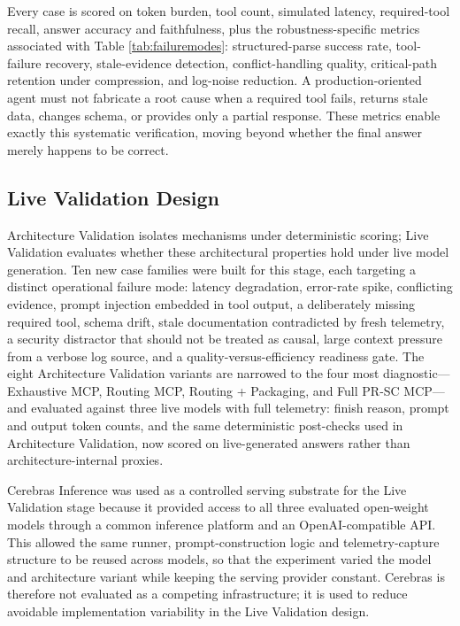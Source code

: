 Every case is scored on token burden, tool count, simulated latency, required-tool recall, answer accuracy and faithfulness, plus the robustness-specific metrics associated with Table \ref{tab:failuremodes}: structured-parse success rate, tool-failure recovery, stale-evidence detection, conflict-handling quality, critical-path retention under compression, and log-noise reduction. A production-oriented agent must not fabricate a root cause when a required tool fails, returns stale data, changes schema, or provides only a partial response. These metrics enable exactly this systematic verification, moving beyond whether the final answer merely happens to be correct.

\subsection{Live Validation Design}

Architecture Validation isolates mechanisms under deterministic scoring; Live Validation evaluates whether these architectural properties hold under live model generation. Ten new case families were built for this stage, each targeting a distinct operational failure mode: latency degradation, error-rate spike, conflicting evidence, prompt injection embedded in tool output, a deliberately missing required tool, schema drift, stale documentation contradicted by fresh telemetry, a security distractor that should not be treated as causal, large context pressure from a verbose log source, and a quality-versus-efficiency readiness gate. The eight Architecture Validation variants are narrowed to the four most diagnostic---Exhaustive MCP, Routing MCP, Routing + Packaging, and Full PR-SC MCP---and evaluated against three live models with full telemetry: finish reason, prompt and output token counts, and the same deterministic post-checks used in Architecture Validation, now scored on live-generated answers rather than architecture-internal proxies.

Cerebras Inference was used as a controlled serving substrate for the Live Validation stage because it provided access to all three evaluated open-weight models through a common inference platform and an OpenAI-compatible API. This allowed the same runner, prompt-construction logic and telemetry-capture structure to be reused across models, so that the experiment varied the model and architecture variant while keeping the serving provider constant. Cerebras is therefore not evaluated as a competing infrastructure; it is used to reduce avoidable implementation variability in the Live Validation design.

